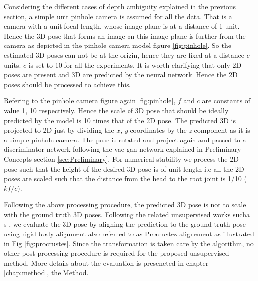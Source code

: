 Considering the different cases of depth ambiguity explained in the previous section, a simple unit pinhole camera is assumed for all the data. That is a camera with a unit focal length, whose image plane is at a distance of 1 unit. Hence the 3D pose that forms an image on this image plane is further from the camera as depicted in the pinhole camera model figure \ref{fig:pinhole}. So the estimated 3D poses can not be at the origin, hence they are fixed at a distance $c$ units. $c$ is set to 10 for all the experiments. It is worth clarifying that only 2D poses are present and 3D are predicted by the neural network. Hence the 2D poses should be processed to achieve this. 

Refering to the pinhole camera figure again \ref{fig:pinhole}, $f$ and $c$ are constants of value 1, 10 respectively. Hence the scale of 3D pose that should be ideally predicted by the model is 10 times that of the 2D pose. The predicted 3D is projected to 2D just by dividing the $x$, $y$ coordinates by the $z$ component as it is a simple pinhole camera. The pose is rotated and project again and passed to a discriminator network following the \ac{vae}-\ac{gan} network explained in Preliminary Concepts section \ref{sec:Preliminary}. For numerical stability we process the 2D pose such that the height of the desired 3D pose is of unit length i.e all the 2D poses are scaled such that the distance from the head to the root joint is 1/10 ($k f/c$). 

Following the above processing procedure, the predicted 3D pose is not to scale with the ground truth 3D poses. Following the related unsupervised works sucha s \cite{amazon1}, we evaluate the 3D pose by aligning the prediction to the ground truth pose using rigid body alignment also referred to as Procrustes alignement as illustrated in Fig \ref{fig:procrustes}. Since the transformation is taken care by the algorithm, no other post-processing procedure is required for the proposed unsupervised method. More details about the evaluation is preseneted in chapter \ref{chap:method}, the Method.



